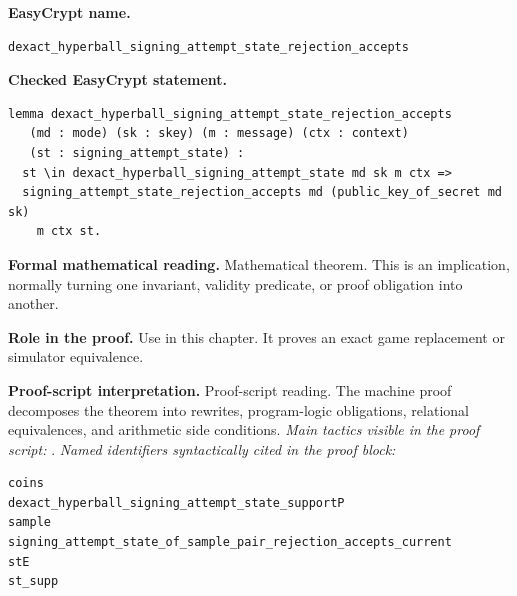 \begin{formaltheorem}
\noindent\textbf{EasyCrypt name.}
\begin{lstlisting}[language=EasyCrypt,basicstyle=\ttfamily\scriptsize]
dexact_hyperball_signing_attempt_state_rejection_accepts
\end{lstlisting}
\noindent\textbf{Checked EasyCrypt statement.}
\begin{lstlisting}[language=EasyCrypt,basicstyle=\ttfamily\scriptsize]
lemma dexact_hyperball_signing_attempt_state_rejection_accepts
   (md : mode) (sk : skey) (m : message) (ctx : context)
   (st : signing_attempt_state) :
  st \in dexact_hyperball_signing_attempt_state md sk m ctx =>
  signing_attempt_state_rejection_accepts md (public_key_of_secret md sk)
    m ctx st.
\end{lstlisting}
\noindent\textbf{Formal mathematical reading.}
Mathematical theorem. This is an implication, normally turning one invariant, validity predicate, or proof obligation into another.

\noindent\textbf{Role in the proof.}
Use in this chapter. It proves an exact game replacement or simulator equivalence.

\noindent\textbf{Proof-script interpretation.}
Proof-script reading. The machine proof decomposes the theorem into rewrites, program-logic obligations, relational equivalences, and arithmetic side conditions.
\emph{Main tactics visible in the proof script:} .
\emph{Named identifiers syntactically cited in the proof block:}
\begin{lstlisting}[language=EasyCrypt,basicstyle=\ttfamily\scriptsize]
coins
dexact_hyperball_signing_attempt_state_supportP
sample
signing_attempt_state_of_sample_pair_rejection_accepts_current
stE
st_supp
\end{lstlisting}

\end{formaltheorem}

